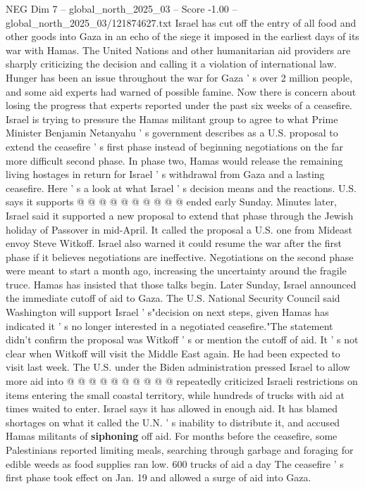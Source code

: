 \begin{textsample}{NEG Dim 7 – global\_north\_2025\_03 – Score -1.00 – global\_north\_2025\_03/121874627.txt}  \label{ex:f7_neg_137}
Israel has cut off the entry of all food and other goods into Gaza in an echo of the siege it imposed in the earliest days of its war with Hamas.
The United Nations and other humanitarian aid providers are sharply criticizing the decision and calling it a violation of international law.
Hunger has been an issue throughout the war for Gaza ' s over 2 million people, and some aid experts had warned of possible famine.
Now there is concern about losing the progress that experts reported under the past six weeks of a ceasefire.
Israel is trying to pressure the Hamas militant group to agree to what Prime Minister Benjamin Netanyahu ' s government describes as a U.S. proposal to extend the ceasefire ' s first phase instead of beginning negotiations on the far more difficult second phase.
In phase two, Hamas would release the remaining living hostages in return for Israel ' s withdrawal from Gaza and a lasting ceasefire.
Here ' s a look at what Israel ' s decision means and the reactions.
U.S. says it supports @ @ @ @ @ @ @ @ @ @ ended early Sunday.
Minutes later, Israel said it supported a new proposal to extend that phase through the Jewish holiday of Passover in mid-April.
It called the proposal a U.S. one from Mideast envoy Steve Witkoff.
Israel also warned it could resume the war after the first phase if it believes negotiations are ineffective.
Negotiations on the second phase were meant to start a month ago, increasing the uncertainty around the fragile truce.
Hamas has insisted that those talks begin.
Later Sunday, Israel announced the immediate cutoff of aid to Gaza.
The U.S.
National Security Council said Washington will support Israel ' s"decision on next steps, given Hamas has indicated it ' s no longer interested in a negotiated ceasefire."The statement didn't confirm the proposal was Witkoff ' s or mention the cutoff of aid.
It ' s not clear when Witkoff will visit the Middle East again.
He had been expected to visit last week.
The U.S. under the Biden administration pressed Israel to allow more aid into @ @ @ @ @ @ @ @ @ @ repeatedly criticized Israeli restrictions on items entering the small coastal territory, while hundreds of trucks with aid at times waited to enter.
Israel says it has allowed in enough aid.
It has blamed shortages on what it called the U.N. ' s inability to distribute it, and accused Hamas militants of \textbf{siphoning} off aid.
For months before the ceasefire, some Palestinians reported limiting meals, searching through garbage and foraging for edible weeds as food supplies ran low. 600 trucks of aid a day The ceasefire ' s first phase took effect on Jan. 19 and allowed a surge of aid into Gaza.

\end{textsample}
